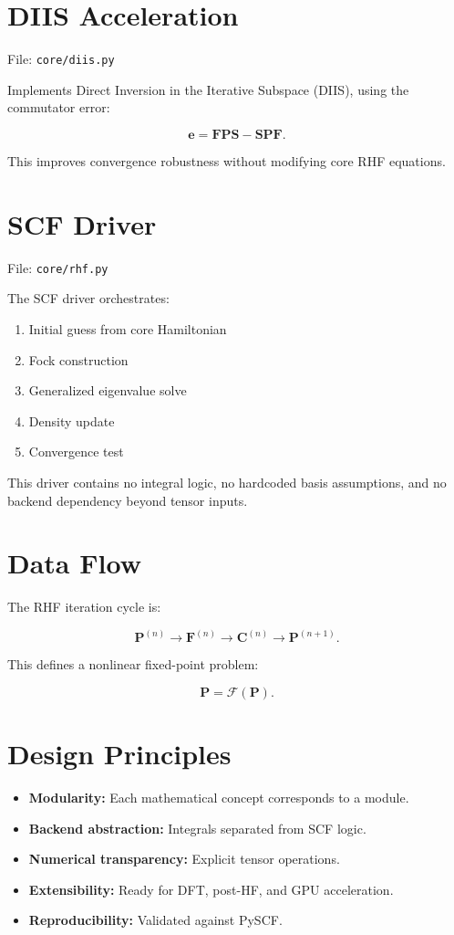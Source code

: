 \documentclass[11pt]{article}
\begin{document}
\section{DIIS Acceleration}

File: \texttt{core/diis.py}

Implements Direct Inversion in the Iterative Subspace (DIIS),
using the commutator error:

\[
\mathbf{e} = \mathbf{F}\mathbf{P}\mathbf{S}
- \mathbf{S}\mathbf{P}\mathbf{F}.
\]

This improves convergence robustness without modifying
core RHF equations.

\section{SCF Driver}

File: \texttt{core/rhf.py}

The SCF driver orchestrates:

\begin{enumerate}
\item Initial guess from core Hamiltonian
\item Fock construction
\item Generalized eigenvalue solve
\item Density update
\item Convergence test
\end{enumerate}

This driver contains no integral logic,
no hardcoded basis assumptions,
and no backend dependency beyond tensor inputs.

\section{Data Flow}

The RHF iteration cycle is:

\[
\mathbf{P}^{(n)}
\rightarrow
\mathbf{F}^{(n)}
\rightarrow
\mathbf{C}^{(n)}
\rightarrow
\mathbf{P}^{(n+1)}.
\]

This defines a nonlinear fixed-point problem:

\[
\mathbf{P} = \mathcal{F}(\mathbf{P}).
\]

\section{Design Principles}

\begin{itemize}
\item \textbf{Modularity:} Each mathematical concept corresponds to a module.
\item \textbf{Backend abstraction:} Integrals separated from SCF logic.
\item \textbf{Numerical transparency:} Explicit tensor operations.
\item \textbf{Extensibility:} Ready for DFT, post-HF, and GPU acceleration.
\item \textbf{Reproducibility:} Validated against PySCF.
\end{itemize}
\end{document}
